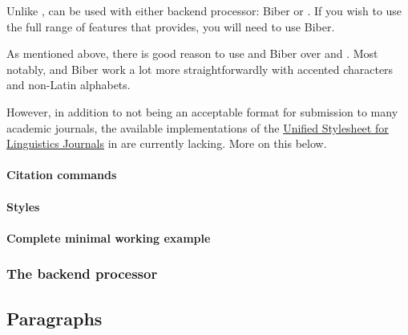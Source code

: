 \label{subsubsubsec:biblatex}

Unlike ,  can be used with either backend processor: Biber or .
If you wish to use the full range of features that  provides, you will need to use Biber.

As mentioned above, there is good reason to use  and Biber over  and .
Most notably,  and Biber work a lot more straightforwardly with accented characters and non-Latin alphabets.

However, in addition to not being an acceptable format for submission to many academic journals, the available implementations of the \href{http://celxj.org/downloads/UnifiedStyleSheet.pdf}{Unified Stylesheet for Linguistics Journals} in  are currently lacking.
More on this below.

\paragraph{Citation commands}



\paragraph{Styles}



\paragraph{Complete minimal working example}



\subsubsection{The backend processor}
\label{subsubsec:the-backend-processor}

\label{subsubsubsec:bibtex}



\label{subsubsubsec:biber}



\subsection{Paragraphs}
\label{subsec:paragraphs}


